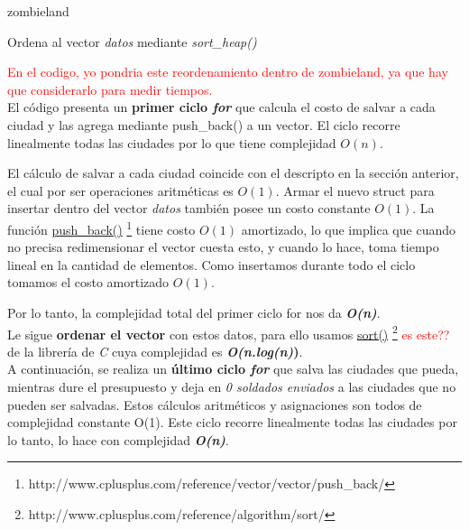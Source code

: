 \documentclass[a4paper]{article}
\begin{document}
\begin{algorithm}[h!]
\caption{zombieland}
Ordena al vector \emph{datos} mediante \textit{sort_heap()}\\
\end{algorithm}
\textcolor{red}{En el codigo, yo pondria este reordenamiento dentro de zombieland, ya que hay que considerarlo para medir tiempos.}\\

El c\'odigo presenta un \textbf{primer ciclo \emph{for}} que calcula el costo de salvar a cada ciudad y las agrega mediante push_back() a un vector. El ciclo recorre linealmente todas las ciudades por lo que tiene complejidad $O(n)$. 

El c\'alculo de salvar a cada ciudad coincide con el descripto en la secci\'on anterior, el cual por ser operaciones aritm\'eticas es $O(1)$. Armar el nuevo struct para insertar dentro del vector \emph{datos} tambi\'en posee un costo constante $O(1)$. La funci\'on \href{http://www.cplusplus.com/reference/vector/vector/push_back/}{push\_back()} \footnote{http://www.cplusplus.com/reference/vector/vector/push_back/} tiene costo $O(1)$ amortizado, lo que implica que cuando no precisa redimensionar el vector cuesta esto, y cuando lo hace, toma tiempo lineal en la cantidad de elementos. Como insertamos durante todo el ciclo tomamos el costo amortizado $O(1)$. 

Por lo tanto, la complejidad total del primer ciclo for nos da \textbf{\textit{O(n)}}.\\

Le sigue \textbf{ordenar el vector} con estos datos, para ello usamos \href{http://www.cplusplus.com/reference/algorithm/sort/}{sort()} \footnote{http://www.cplusplus.com/reference/algorithm/sort/} \textcolor{red}{es este??}de la librer\'ia de \emph{C} cuya complejidad es \textbf{\textit{O(n.log(n)})}.\\

A continuaci\'on, se realiza un \textbf{\'ultimo ciclo \emph{for}} que salva las ciudades que pueda, mientras dure el presupuesto y deja en \emph{0 soldados enviados} a las ciudades que no pueden ser salvadas. Estos c\'alculos aritm\'eticos y asignaciones son todos de complejidad constante O(1). Este ciclo recorre linealmente todas las ciudades por lo tanto, lo hace con complejidad \textbf{\textit{O(n)}}.\\
\end{document}
